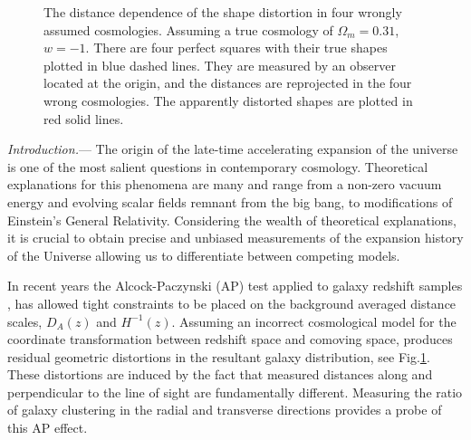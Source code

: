 \documentclass[prl,twocolumn,superscriptaddress,aps,amsmath,amssymb,nofootinbib,altaffilletter]{revtex4}
\begin{document}
\begin{figure}
   \caption{\label{fig_xy}
   The distance dependence of the shape distortion in four wrongly assumed cosmologies.
   Assuming a true cosmology of $\Omega_m=0.31$, $w=-1$.
   There are four perfect squares with their true shapes plotted in blue dashed lines.
   They are measured by an observer located at the origin, and the distances are reprojected in the four wrong cosmologies.
   The apparently distorted shapes are plotted in red solid lines.
   }
\end{figure}

{\it Introduction.}---
The  origin  of  the late-time accelerating  expansion  of  the  universe  is  one of  the  most  salient  questions  in  contemporary cosmology. Theoretical explanations for this phenomena are many and range from a non-zero  vacuum energy and evolving  scalar  fields  remnant  from  the  big  bang, to modifications of Einstein's General Relativity\cite{2012IJMPD..2130002Y}. 
Considering the wealth of theoretical explanations, it is crucial to obtain precise and unbiased measurements of the expansion history of the Universe allowing us to 
differentiate between competing models. 

In recent years the Alcock-Paczynski (AP) test \citep{AP1979} applied to galaxy redshift samples \citep{Outram2004,Blake2011,Alam2016}, 
has allowed tight constraints to be placed on the background averaged distance scales, $D_A(z)$ and $H^{-1}(z)$.  
Assuming an incorrect cosmological model for the coordinate transformation between redshift space and comoving space, produces residual geometric distortions in the resultant galaxy distribution, see  Fig.\ref{fig_xy}. 
These distortions are induced by the fact that measured distances along 
and perpendicular to the line of sight are fundamentally different. 
Measuring the ratio of galaxy clustering in the radial and transverse directions provides a probe of this AP effect.
\end{document}
